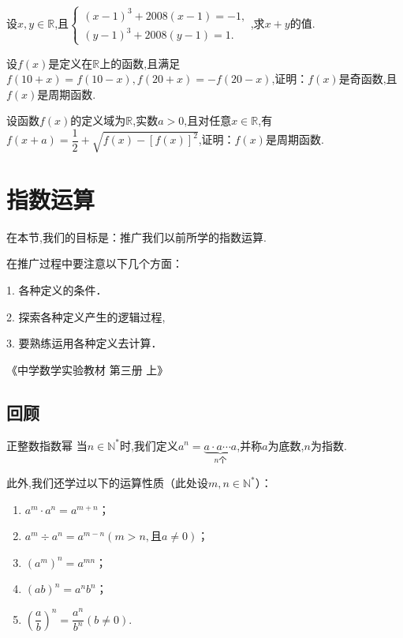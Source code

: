 \documentclass[lang=cn,math=cm,chinesefont=nofont,11pt,scheme=chinese,twocol]{elegantbook}
\begin{document}
\begin{exercise}\label{ASJC_G1_P30.11}
  设$x,y\in\mathbb{R}$,且$\begin{cases}(x-1)^3+2008(x-1)=-1,\\(y-1)^3+2008(y-1)=1.\end{cases}$,求$x+y$的值.
\end{exercise}

\begin{exercise}\label{HS2FZ_lkb1_P57.3}
  设$f(x)$是定义在$\mathbb{R}$上的函数,且满足$f(10+x)=f(10-x),f(20+x)=-f(20-x)$,证明：$f(x)$是奇函数,且$f(x)$是周期函数.
\end{exercise}

\begin{exercise}\label{HS2FZ_lkb1_P55.2}
  设函数$f(x)$的定义域为$\mathbb{R}$,实数$a>0$,且对任意$x\in\mathbb{R}$,有$f(x+a)=\dfrac{1}{2}+\sqrt{f(x)-[f(x)]^{2}}$,证明：$f(x)$是周期函数.
\end{exercise}

\section{指数运算}

在本节,我们的目标是：推广我们以前所学的指数运算.

\epigraph{在推广过程中要注意以下几个方面：

1. 各种定义的条件．

2. 探索各种定义产生的逻辑过程,

3. 要熟练运用各种定义去计算．}{《中学数学实验教材 第三册 上》}

\subsection{回顾}

\begin{definition}{正整数指数幂}
  当$n\in\mathbb{N}^*$时,我们定义$a^n=\underbrace{a\cdot a\cdots a}_{n\text{个}}$,并称$a$为底数,$n$为指数.
\end{definition}

此外,我们还学过以下的运算性质（此处设$m,n\in\mathbb{N}^*$）：

\begin{property}\label{LawOfIndices1}
  \begin{spacing}{1.8}
    \begin{enumerate}
    \item $a^m\cdot a^n=a^{m+n}$；
    \item $a^m\div a^n=a^{m-n}(m>n,\text{且}a\neq 0)$；
    \item $(a^m)^n=a^{mn}$；
    \item $(ab)^n=a^nb^n$；
    \item $\left(\dfrac ab\right)^n=\dfrac{a^n}{b^n}(b\neq 0)$.
    \end{enumerate}  
  \end{spacing}
\end{property}
\end{document}
